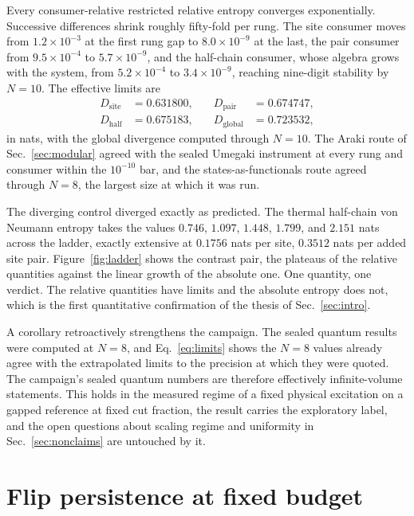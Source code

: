 \documentclass[aps,prd,reprint,nofootinbib,longbibliography]{revtex4-2}
\begin{document}
Every consumer-relative restricted relative entropy converges
exponentially.  Successive differences shrink roughly fifty-fold per
rung.  The site consumer moves from $1.2\times 10^{-3}$ at the first
rung gap to $8.0\times 10^{-9}$ at the last, the pair consumer from
$9.5\times 10^{-4}$ to $5.7\times 10^{-9}$, and the half-chain consumer,
whose algebra grows with the system, from $5.2\times 10^{-4}$ to
$3.4\times 10^{-9}$, reaching nine-digit stability by $N=10$.  The
effective limits are
\begin{equation}
\begin{aligned}
D_{\text{site}} &= 0.631800, &\quad D_{\text{pair}} &= 0.674747,\\
D_{\text{half}} &= 0.675183, &\quad D_{\text{global}} &= 0.723532,
\end{aligned}
\label{eq:limits}
\end{equation}
in nats, with the global divergence computed through $N=10$.  The Araki
route of Sec.~\ref{sec:modular} agreed with the sealed Umegaki instrument
at every rung and consumer within the $10^{-10}$ bar, and the
states-as-functionals route agreed through $N=8$, the largest size at
which it was run.

The diverging control diverged exactly as predicted.  The thermal
half-chain von Neumann entropy takes the values $0.746$, $1.097$,
$1.448$, $1.799$, and $2.151$ nats across the ladder, exactly extensive
at $0.1756$ nats per site, $0.3512$ nats per added site pair.  Figure~\ref{fig:ladder} shows the
contrast pair, the plateaus of the relative quantities against the linear
growth of the absolute one.  One quantity, one verdict.  The relative
quantities have limits and the absolute entropy does not, which is the
first quantitative confirmation of the thesis of Sec.~\ref{sec:intro}.

A corollary retroactively strengthens the
campaign.  The sealed quantum results were computed at $N=8$, and
Eq.~\eqref{eq:limits} shows the $N=8$ values already agree with the
extrapolated limits to the precision at which they were quoted.  The
campaign's sealed quantum numbers are therefore effectively
infinite-volume statements.  This holds in the
measured regime of a fixed physical excitation on a gapped reference at
fixed cut fraction, the result carries the exploratory label, and the
open questions about scaling regime and uniformity in
Sec.~\ref{sec:nonclaims} are untouched by it.

\section{Flip persistence at fixed budget}
\label{sec:flip}
\end{document}
